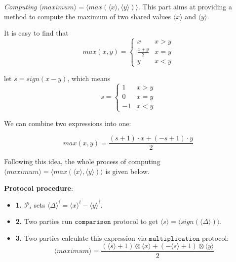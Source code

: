 \documentclass[letterpaper]{article} %
\begin{document}
    
       \emph{Computing} $ \langle maximum\rangle  = \langle max(\langle x\rangle,\langle y\rangle)\rangle $.
       This part aims at providing a method to compute the maximum of two shared values $\langle x \rangle$ and $\langle y \rangle$.
       
       It is easy to find that
       $$max(x,y) = \left\{\begin{matrix}
           x & x>y\\ 
           \frac{x+ y}{2} & x=y\\ 
           y & x<y
           \end{matrix}\right.$$
       
       let $s = sign(x-y)$, which means
       $$s = \left\{\begin{matrix}
           1 & x>y\\ 
           0 & x=y\\ 
           -1 & x<y
           \end{matrix}\right.$$
       
       We can combine two expressions into one:
       
       $$max(x,y) = \frac{(s+1)\cdot x+ (-s+1)\cdot y}{2}$$
       
       
       Following this idea, the whole process of computing $\langle maximum\rangle  = \langle max(\langle x\rangle,\langle y\rangle)\rangle$ is given below.
       
       \textbf{Protocol procedure}:
       \begin{itemize}
           \item \textbf{1.} $\mathcal{P}_{i}$ sets $\langle \Delta \rangle^{i}=\langle x\rangle ^{i}-\langle y\rangle ^{i}$.
           \item \textbf{2.} Two parties run $\mathtt{comparison}$ protocol to get $\langle s\rangle =\langle sign(\langle \Delta \rangle)\rangle$.%
           \item \textbf{3.} Two parties calculate this expression via $\mathtt{multiplication}$ protocol:
           $$\langle maximum\rangle=\frac{(\langle s\rangle+1)\otimes \langle x\rangle+ (-\langle s\rangle+1)\otimes \langle y\rangle}{2}$$
       \end{itemize}
       
\end{document}
